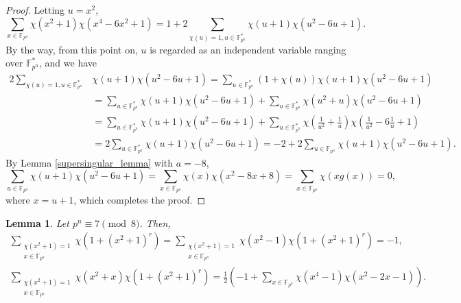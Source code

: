 \documentclass[11pt]{article}
\numberwithin{theorem}{section}
\newtheorem{lemma}[theorem]{Lemma}
\newcommand{\Sum}{\displaystyle \sum}
\newcommand{\Fpn}{\mathbb{F}_{p^n}}
\newcommand{\Fpnmul}{\mathbb{F}_{p^n}^*}
\begin{document}
	\begin{proof}
		Letting $u=x^2$, 
		\begin{equation*}
			\Sum_{x\in \Fpn} \chi(x^2+1)\chi(x^4-6x^2+1) = 1+2\Sum_{\chi(u)=1, u\in \Fpnmul} \chi(u+1)\chi(u^2-6u+1). 
		\end{equation*}
		By the way, from this point on, $u$ is regarded as an independent variable ranging over $\Fpnmul$, and we have
		\begin{align*}
			2\Sum_{\chi(u)=1, u\in \Fpnmul}& \chi(u+1)\chi(u^2-6u+1) = 
			 \Sum_{u\in \Fpnmul} (1+\chi(u))\chi(u+1) \chi(u^2-6u+1)  \\
			&=  \Sum_{u\in \Fpnmul} \chi(u+1) \chi(u^2-6u+1) +\Sum_{u\in \Fpnmul} \chi(u^2+u) \chi(u^2-6u+1)\\
			&=   \Sum_{u\in \Fpnmul} \chi(u+1) \chi(u^2-6u+1)+\Sum_{u\in \Fpnmul} \chi\left(\frac{1}{u^2}+ \frac{1}{u} \right) \chi\left(\frac{1}{u^2} - 6\frac 1 u + 1 \right)  \\
			&=  2\Sum_{u\in \Fpnmul} \chi(u+1) \chi(u^2-6u+1) = -2 + 2\Sum_{u\in \Fpn} \chi(u+1) \chi(u^2-6u+1).
		\end{align*}
		By Lemma \ref{supersingular_lemma} with $a=-8$,
		\begin{equation*}
			 \Sum_{u\in \Fpn} \chi(u+1) \chi(u^2-6u+1)= \Sum_{x\in \Fpn} \chi(x) \chi(x^2-8x+8) =\Sum_{x\in \Fpn} \chi(x g(x))=0,
		\end{equation*}
		 where $x=u+1$, which completes the proof.
	\end{proof}
	
	








\begin{lemma}\label{BS_lemma}
	Let $p^n \equiv 7 \pmod{8}$. Then, 
	\begin{align*}
		\Sum_{\substack{\chi(x^2+1)=1\\ x\in \Fpn}}\chi(1+(x^2+1)^r) = \Sum_{\substack{\chi(x^2+1)=1\\ x\in \Fpn}}\chi(x^2-1)\chi(1+(x^2+1)^r) = -1,\\
		\Sum_{\substack{\chi(x^2+1)=1\\ x\in \Fpn}} \chi(x^2+x) \chi(1+(x^2+1)^r) = \frac{1}{2}\left( -1+\Sum_{x\in \Fpn} \chi(x^4-1)\chi(x^2-2x-1)\right) .
	\end{align*}
\end{lemma}
\end{document}
